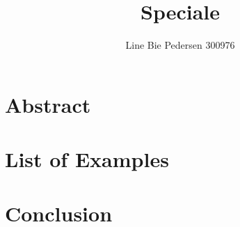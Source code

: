 \documentclass[11pt, a4paper]{article}
\title{Speciale}
\author{Line Bie Pedersen 300976}
\date{}
\theoremstyle{plain}
\theoremstyle{empty}
\theoremstyle{plain}
\begin{document}
\maketitle

\section*{Abstract}

\tableofcontents

\section*{List of Examples}















\section{Conclusion}




\end{document}
